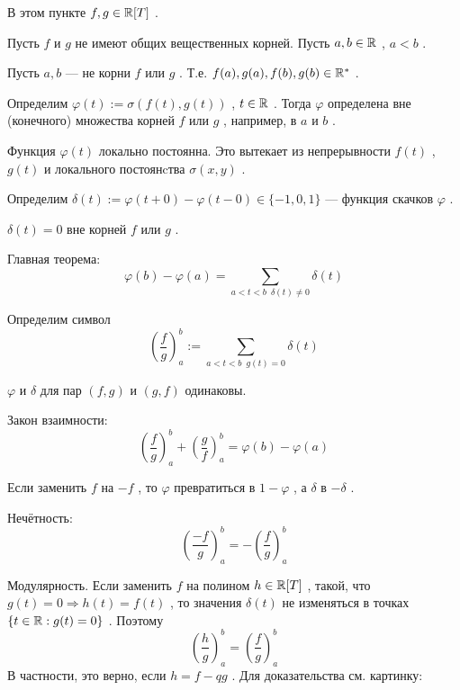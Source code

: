 \SSbullet

В этом пункте \( f,g \in \mathbb{R}[T] \) .

\SSsect Пусть \( f \) и \( g \) не имеют общих вещественных корней. 
Пусть \( a,b \in \mathbb{R} \) , \( a < b \) .

\SSsect Пусть \( a,b \) --- не корни \( f \) или \( g \) .
Т.е. \( f(a),g(a),f(b),g(b) \in \mathbb{R}^* \) .

\SSsect[def] Определим \( \varphi(t) := \sigma(f(t),g(t)) \) , \( t \in \mathbb{R} \) .
Тогда \( \varphi \) определена вне (конечного) множества корней \( f \) или \( g \) ,
например, в \( a \) и \( b \) .

\SSsect Функция \( \varphi(t) \) локально постоянна. Это вытекает из непрерывности \( f(t) \) ,
\( g(t) \) и локального постоянcтва \( \sigma(x,y) \) .

\vspace
{}


\SSsect[def] Определим \( \delta(t) := \varphi(t+0) - \varphi(t-0) \in \{-1,0,1\} \) --- 
функция скачков \( \varphi \) .

\SSsect \( \delta(t) = 0 \) вне корней \( f \) или \( g \) .

\SSsect[!!] Главная теорема:
\[ \varphi(b) - \varphi(a) = \sum_{ a<t<b \enspace \delta(t) \neq 0 } \delta(t) \]

\SSsect[def] Определим символ
\[ \left( \frac{f}{g} \right)^b_a := \sum_{ a<t<b \enspace g(t)=0 } \delta(t) \]

\SSsect \( \varphi \) и \( \delta \) для пар \( (f,g) \) и \( (g,f) \) одинаковы.

\SSsect[!!] Закон взаимности:
\[ \left( \frac{f}{g} \right)^b_a + \left( \frac{g}{f} \right)^b_a = \varphi(b)-\varphi(a) \]

\SSsect Если заменить \( f \) на \( -f \) , то \( \varphi \) превратиться в \( 1-\varphi \) , а \( \delta \) в \( -\delta \) .

\SSsect[!] Нечётность:
\[ \left( \frac{-f}{g} \right)^b_a = - \left( \frac{f}{g} \right)^b_a \]

\SSsect[!] Модулярность. Если заменить \( f \) на полином \( h \in \mathbb{R}[T] \) , такой, что
\( g(t) = 0 \Rightarrow h(t) = f(t) \) , то значения \( \delta(t) \) не изменяться в точках
\( \{ t \in \mathbb{R} : g(t) = 0 \} \) . Поэтому
\[ \left( \frac{h}{g} \right)^b_a = \left( \frac{f}{g} \right)^b_a \]
В частности, это верно, если \( h=f-qg \) . Для доказательства см. картинку:
\vspace
{}

\vspace

\SSbullet

\SSbullet





